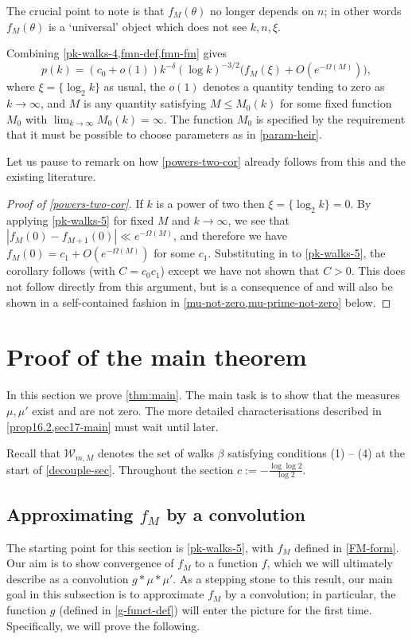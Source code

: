 \documentclass[11pt,reqno]{amsart}
\numberwithin{equation}{section}
\theoremstyle{definition}
\theoremstyle{remark}
\renewcommand{\le}{\leqslant}
\begin{document}
The crucial point to note is that $f_M(\theta)$ no longer depends on $n$; in other words $f_M(\theta)$ is a `universal' object which does not see $k, n , \xi$.

Combining \cref{pk-walks-4,fmn-def,fmn-fm} gives
\begin{equation}\label{pk-walks-5}  p(k) =  (c_0 + o(1))  k^{-\delta} (\log k)^{-3/2}  \big( f_{M}(\xi) +  O ( e^{-\Omega(M)}) \big),
\end{equation}
where $\xi = \{\log_2 k\}$ as usual, the $o(1)$ denotes a quantity tending to zero as $k \rightarrow \infty$, and $M$ is any quantity satisfying $M \le M_0(k)$ for some fixed function $M_0$ with $\lim_{k \rightarrow \infty} M_0(k)=\infty$. The function $M_0$ is specified by the requirement that it must be possible to choose parameters as in \cref{param-heir}.

Let us pause to remark on how \cref{powers-two-cor} already follows from this and the existing literature. 


\begin{proof}[Proof of \cref{powers-two-cor}]
If $k$ is a power of two then $\xi = \{ \log_2 k\} = 0$. By applying \cref{pk-walks-5} for fixed $M$ and $k \rightarrow \infty$, we see that $|f_M(0) - f_{M+1}(0)| \ll e^{-\Omega(M)}$, and therefore we have $f_M(0) = c_1 + O(e^{-\Omega(M)})$ for some $c_1$. Substituting in to \cref{pk-walks-5}, the corollary follows (with $C = c_0 c_1$) except we have not shown that $C > 0$. This does not follow directly from this argument, but is a consequence of \cite{EFG16} and will also be shown in a self-contained fashion in \cref{mu-not-zero,mu-prime-not-zero} below.
\end{proof}


\section{Proof of the main theorem}\label{sec15-mainthm-proof}

In this section we prove \cref{thm:main}. The main task is to show that the measures $\mu, \mu'$ exist and are not zero. The more detailed characterisations described in \cref{prop16.2,sec17-main} must wait until later.


Recall that $\mathscr{W}_{m,M}$ denotes the set of walks $\beta$ satisfying conditions (1) -- (4) at the start of \cref{decouple-sec}. Throughout the section $c := -\frac{\log \log 2}{\log 2}$.


\subsection{Approximating $f_M$ by a convolution} The starting point for this section is \cref{pk-walks-5}, with $f_M$ defined in \cref{FM-form}. Our aim is to show convergence of $f_M$ to a function $f$, which we will ultimately describe as a convolution $g \ast \mu \ast \mu'$. As a stepping stone to this result, our main goal in this subsection is to approximate $f_M$ by a convolution; in particular, the function $g$ (defined in \cref{g-funct-def}) will enter the picture for the first time. Specifically, we will prove the following.
\end{document}
